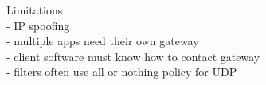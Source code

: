 \documentclass[10pt, a4paper]{article}
\begin{document}
\begin{multicols*}{3}
		Limitations\\
		- IP spoofing\\
		- multiple apps need their own gateway\\
		- client software must know how to contact gateway\\
		- filters often use all or nothing policy for UDP\\


























		

		
		
	\end{multicols*}
\end{document}
